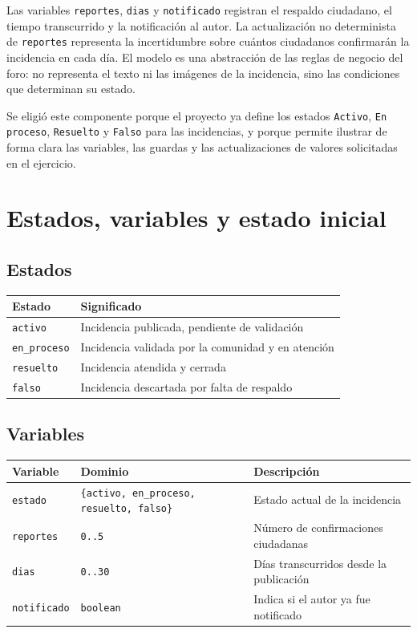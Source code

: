 \documentclass[11pt,a4paper]{article}
\begin{document}
Las variables \texttt{reportes}, \texttt{dias} y \texttt{notificado} registran el respaldo ciudadano, el tiempo transcurrido y la notificación al autor. La actualización no determinista de \texttt{reportes} representa la incertidumbre sobre cuántos ciudadanos confirmarán la incidencia en cada día. El modelo es una abstracción de las reglas de negocio del foro: no representa el texto ni las imágenes de la incidencia, sino las condiciones que determinan su estado.

Se eligió este componente porque el proyecto ya define los estados \texttt{Activo}, \texttt{En proceso}, \texttt{Resuelto} y \texttt{Falso} para las incidencias, y porque permite ilustrar de forma clara las variables, las guardas y las actualizaciones de valores solicitadas en el ejercicio.

\section{Estados, variables y estado inicial}

\subsection{Estados}

\begin{center}
\begin{tabular}{|l|p{9cm}|}
\hline
\textbf{Estado} & \textbf{Significado} \\
\hline
\texttt{activo} & Incidencia publicada, pendiente de validación \\
\hline
\texttt{en\_proceso} & Incidencia validada por la comunidad y en atención \\
\hline
\texttt{resuelto} & Incidencia atendida y cerrada \\
\hline
\texttt{falso} & Incidencia descartada por falta de respaldo \\
\hline
\end{tabular}
\end{center}

\subsection{Variables}

\begin{center}
\begin{tabular}{|l|p{5.2cm}|p{6.8cm}|}
\hline
\textbf{Variable} & \textbf{Dominio} & \textbf{Descripción} \\
\hline
\texttt{estado} & \texttt{\{activo, en\_proceso, resuelto, falso\}} & Estado actual de la incidencia \\
\hline
\texttt{reportes} & \texttt{0..5} & Número de confirmaciones ciudadanas \\
\hline
\texttt{dias} & \texttt{0..30} & Días transcurridos desde la publicación \\
\hline
\texttt{notificado} & \texttt{boolean} & Indica si el autor ya fue notificado \\
\hline
\end{tabular}
\end{center}
\end{document}
